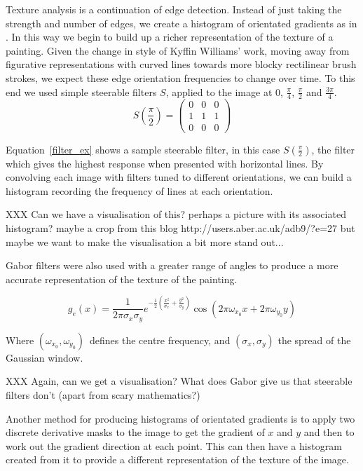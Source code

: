 \documentclass[conference,a4paper]{IEEEtran}
\begin{document}
Texture analysis is a continuation of edge detection. Instead of just taking
the strength and number of edges, we create a histogram of orientated gradients
as in \cite{Dalal2005Histograms}. In this way we begin to build up a richer
representation of the texture of a painting. Given the change in style of
Kyffin Williams' work, moving away from figurative representations with curved
lines towards more blocky rectilinear brush strokes, we expect these edge
orientation frequencies to change over time. To this end we used simple
steerable filters $S$, applied to the image at $0$, $\frac{\pi}{4}$,
$\frac{\pi}{2}$ and $\frac{3\pi}{4}$. 
\begin{equation}
S\left(\frac{\pi}{2}\right) = \left( \begin{array}{ccc}
0 & 0 & 0 \\
1 & 1 & 1 \\
0 & 0 & 0 \end{array} \right)
\label{filter_ex}
\end{equation}

Equation~\ref{filter_ex} shows a sample steerable filter, in this case
$S(\frac{\pi}{2})$, the filter which gives the highest response when presented
with horizontal lines. By convolving each image with filters tuned to different
orientations, we can build a histogram recording the frequency of lines at each
orientation.

 XXX Can we have a visualisation of this? perhaps a picture with its associated
histogram? maybe a crop from this blog http://users.aber.ac.uk/adb9/?e=27 but
maybe we want to make the visualisation a bit more stand out...

Gabor filters were also used with a greater range of angles to produce a more
accurate representation of the texture of the painting.

\begin{equation}
g_e(x) = \frac{1}{2\pi\sigma_x \sigma_y}e^{-\frac{1}{2}\left(\frac{x^2}{\sigma_x}+\frac{y^2}{\sigma_y}\right)}\cos(2\pi\omega_{x_0}x + 2\pi\omega_{y_0}y)
\label{gabor_eq}
\end{equation}

Where $(\omega_{x_0},\omega_{y_0})$\ defines the centre frequency, and
$(\sigma_x,\sigma_y)$ the spread of the Gaussian window.


 XXX Again, can we get a visualisation? What does Gabor give us that steerable 
filters don't (apart from scary mathematics?)

Another method for producing histograms of orientated gradients is to apply two
discrete derivative masks to the image to get the gradient of $x$ and $y$ and
then to work out the gradient direction at each point. This can then have a
histogram created from it to provide a different representation of the texture
of the image.
\end{document}
